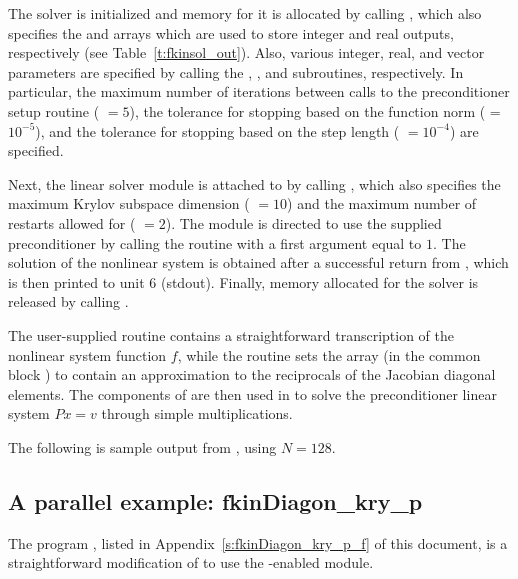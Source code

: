 The {\kinsol} solver is initialized and memory for it is allocated by
calling , which also specifies the  and 
arrays which are used to store integer and real outputs, respectively
(see Table~\ref{t:fkinsol_out}). Also,
various integer, real, and vector parameters are specified by calling the
, , and  subroutines,
respectively. In particular, the maximum number of 
iterations between calls to the preconditioner setup routine ( $=5$),
the tolerance for stopping based on the function norm ( = $10^{-5}$),
and the tolerance for stopping based on the step length ( $=10^{-4}$)
are specified.

Next, the {\kinspgmr} linear solver module is attached to {\kinsol} by calling
, which also specifies the maximum Krylov subspace dimension
( $=10$) and the maximum number of restarts allowed for {\spgmr}
( $=2$).  The {\kinspgmr} module is directed to use the supplied
preconditioner by  calling the  routine
with a first argument equal to $1$. The solution of the
nonlinear system is obtained after a successful return from , which
is then printed to unit 6 (stdout).
Finally, memory allocated for the {\kinsol} solver is released by
calling .

The user-supplied routine  contains a straightforward transcription
of the nonlinear system function $f$, while the routine  sets the
array  (in the common block ) to contain an approximation to 
the reciprocals of the Jacobian diagonal elements. The components of  are
then used in  to solve the preconditioner linear system $Px=v$
through simple multiplications.

The following is sample output from , using $N = 128$.



\subsection{A parallel example: fkinDiagon\_kry\_p}\label{ss:fkinDiagon_kry_p}

The program , listed in Appendix~\ref{s:fkinDiagon_kry_p_f}
of this document, is a straightforward modification of 
to use the {\mpi}-enabled {\nvecp} module.

